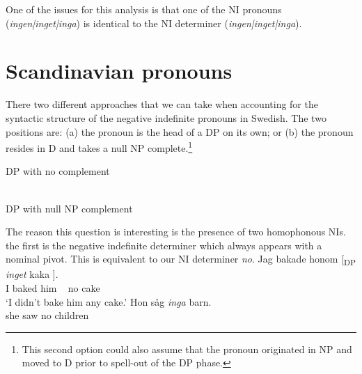 \documentclass[12pt, letterpaper]{article}
\begin{document}
One of the issues for this analysis is that one of the NI pronouns (\textit{ingen|inget|inga}) is identical to the NI determiner (\textit{ingen|inget|inga}).

\section{Scandinavian pronouns} \label{sec:PRONOUNS}

\ea There two different approaches that we can take when accounting for the syntactic structure of the negative indefinite pronouns in Swedish. The two positions are: (a) the pronoun is the head of a DP on its own; or (b) the pronoun resides in D and takes a null NP complete.\footnote{This second option could also assume that the pronoun originated in NP and moved to D prior to spell-out of the DP phase.}
	\begin{multicols}{2}
	\begin{xlist}
		\ex DP with no complement \label{ex:NNP}\\
		\vspace{2em}\\
		\ex DP with null NP complement \label{ex:DN} \\
	\end{xlist}
	\end{multicols}
\ex The reason this question is interesting is the presence of two homophonous NIs. 
	\ea the first is the negative indefinite determiner which always appears with a nominal pivot. This is equivalent to our NI determiner \emph{no}.
		\ea 
		\gll Jag bakade honom [\textsubscript{DP} \emph{inget} kaka ].\\
		I baked him ~ no cake\\
		\glt `I didn't bake him any cake.'  
		\ex 
		\gll Hon såg \emph{inga} barn.\\
		she saw no children\\
\end{document}

